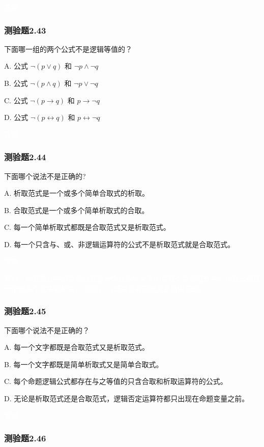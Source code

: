 \documentclass[UTF8, heading=true]{ctexart}
\begin{document}
\textcolor{white}{答案：C}

\subsubsection{测验题2.43}

下面哪一组的两个公式不是逻辑等值的？

A. 公式 $\neg(p \vee q)$ 和 $\neg p \wedge \neg q$

B. 公式 $\neg(p \wedge q)$ 和 $\neg p \vee \neg q$

C. 公式 $\neg(p \rightarrow q)$ 和 $p \rightarrow \neg q$

D.  公式 $\neg(p \leftrightarrow q)$ 和 $p \leftrightarrow \neg q$

\textcolor{white}{答案：C}

\subsubsection{测验题2.44}

下面哪个说法不是正确的?

A. 析取范式是一个或多个简单合取式的析取。

B. 合取范式是一个或多个简单析取式的合取。

C. 每一个简单析取式都既是合取范式又是析取范式。

D. 每一个只含与、或、非逻辑运算符的公式不是析取范式就是合取范式。

\textcolor{white}{答案：D}

\textcolor{white}{解析：析取范式中的合取式都是\textbf{一个}或多个文字的合取；合取范式中的析取式都是\textbf{一个}或多个文字的析取。
因此$p \vee q$既是析取范式又是合取范式。}

\subsubsection{测验题2.45}

下面哪个说法不是正确的？

A. 
每一个文字都既是合取范式又是析取范式。

B. 
每一个文字都既是简单析取式又是简单合取式。

C. 
每个命题逻辑公式都存在与之等值的只含合取和析取运算符的公式。

D.  
无论是析取范式还是合取范式，逻辑否定运算符都只出现在命题变量之前。

\textcolor{white}{答案：C}

\subsubsection{测验题2.46}
\end{document}
